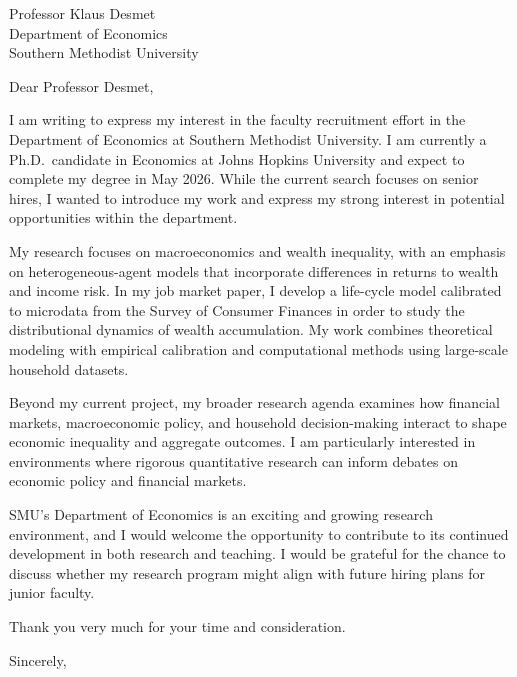 \documentclass[11pt]{letter}
\begin{document}
\begin{letter}{Professor Klaus Desmet \\
Department of Economics \\
Southern Methodist University}

\opening{Dear Professor Desmet,}

I am writing to express my interest in the faculty recruitment effort in the Department of Economics at Southern Methodist University. I am currently a Ph.D.\ candidate in Economics at Johns Hopkins University and expect to complete my degree in May 2026. While the current search focuses on senior hires, I wanted to introduce my work and express my strong interest in potential opportunities within the department.

My research focuses on macroeconomics and wealth inequality, with an emphasis on heterogeneous-agent models that incorporate differences in returns to wealth and income risk. In my job market paper, I develop a life-cycle model calibrated to microdata from the Survey of Consumer Finances in order to study the distributional dynamics of wealth accumulation. My work combines theoretical modeling with empirical calibration and computational methods using large-scale household datasets.

Beyond my current project, my broader research agenda examines how financial markets, macroeconomic policy, and household decision-making interact to shape economic inequality and aggregate outcomes. I am particularly interested in environments where rigorous quantitative research can inform debates on economic policy and financial markets.

SMU’s Department of Economics is an exciting and growing research environment, and I would welcome the opportunity to contribute to its continued development in both research and teaching. I would be grateful for the chance to discuss whether my research program might align with future hiring plans for junior faculty.

Thank you very much for your time and consideration.

\closing{Sincerely,}

\end{letter}
\end{document}
